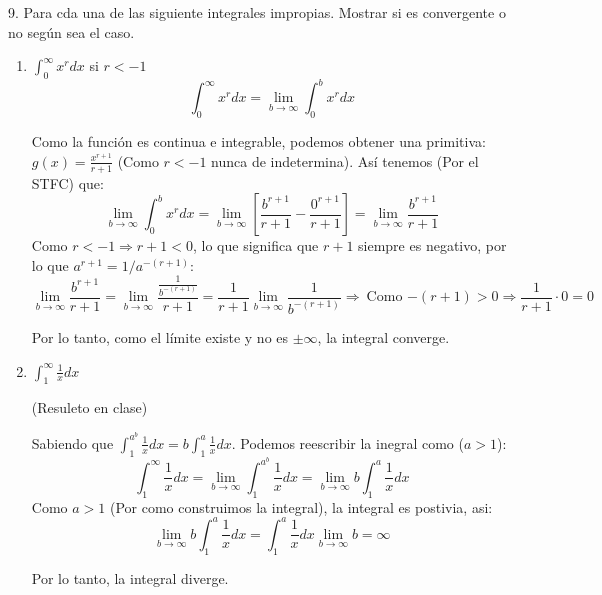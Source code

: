 \documentclass[12pt]{article}
\begin{document}
9. Para cda una de las siguiente integrales impropias. Mostrar si es convergente o no seg\'un sea el caso.

\begin{enumerate}[\hspace{9px} a)]
    \item \(\displaystyle\int_{0}^{\infty}x^rdx\) si $r<-1$
        \begin{equation*}
            \int_{0}^{\infty}x^rdx = \lim_{b\to\infty}\int_{0}^{b}x^rdx
        \end{equation*}

        Como la funci\'on es continua e integrable, podemos obtener una primitiva: \(g(x)=\displaystyle\frac{x^{r+1}}{r+1}\) (Como \(r<-1\) nunca de indetermina). As\'i tenemos (Por el STFC) que:
        \[\lim_{b\to\infty}\int_{0}^{b}x^rdx = \lim_{b\to\infty}\left[\frac{b^{r+1}}{r+1}-\frac{0^{r+1}}{r+1}\right] = \lim_{b\to\infty}\frac{b^{r+1}}{r+1}\]
        Como \(r<-1 \Longrightarrow r+1<0\), lo que significa que \(r+1\) siempre es negativo, por lo que \(a^{r+1}=1/a^{-(r+1)}\):
        \begin{equation*}
            \lim_{b\to\infty}\frac{b^{r+1}}{r+1} = \lim_{b\to\infty}\frac{\frac{1}{b^{-(r+1)}}}{r+1} = \frac{1}{r+1}\lim_{b\to\infty}\frac{1}{b^{-(r+1)}} \Rightarrow\ \text{Como \(-(r+1)>0\)} \Rightarrow \frac{1}{r+1}\cdot0 = 0
        \end{equation*}

        Por lo tanto, como el l\'imite existe y no es \(\pm\infty\), la integral converge.\bigskip

    \item \(\displaystyle\int_{1}^{\infty}\frac{1}{x}dx\)\medskip
        
        (Resuleto en clase)\medskip

        Sabiendo que \(\displaystyle\int_1^{\displaystyle a^b}\frac{1}{x}dx = b\int_1^a\frac{1}{x}dx\). Podemos reescribir la inegral como (\(a>1\)):
        \[\int_{1}^{\infty}\frac{1}{x}dx = \lim_{b\to\infty}\int_{1}^{a^b}\frac{1}{x}dx = \lim_{b\to\infty}b\int_{1}^{a}\frac{1}{x}dx\]
        Como \(a>1\) (Por como construimos la integral), la integral es postivia, asi:
        \[\lim_{b\to\infty}b\int_{1}^{a}\frac{1}{x}dx = \int_{1}^{a}\frac{1}{x}dx\lim_{b\to\infty}b = \infty\]

        Por lo tanto, la integral diverge.\bigskip


\end{enumerate}
\end{document}
